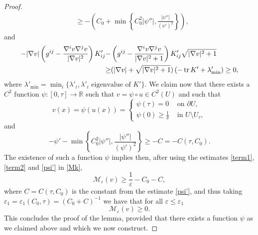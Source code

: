 \documentclass[11pt]{amsart}
\renewcommand{\epsilon}{\varepsilon}
\def\R{\mathbb{R}}
\def\e{\epsilon}
\def\t{\tau}
\def\l{\lambda}
\begin{document}
\begin{proof}
\begin{equation}
\begin{split}
&\ge -\left(C_0+\min\left\{C_0^2|\psi''|,\frac{|\psi''|}{(\psi')^2}\right\}\right),
\end{split}
\end{equation}
and
\begin{equation}\label{term2}
\begin{split}
-|\nabla v|\left(g^{ij}-\dfrac{\nabla^iv \nabla^j v}{|\nabla v|^2}\right)K'_{ij}-&\left(g^{ij}-\dfrac{\nabla^iv \nabla^j v}{|\nabla v|^2+1}\right)K'_{ij} \sqrt{|\nabla v|^2+1}\\
\ge&(|\nabla v|+\sqrt{|\nabla v|^2+1})\left(-\tr K'+\l'_{\min}\right)\ge 0,
\end{split}
\end{equation}
where $\l'_{\min}=\min_i\{\l'_i, \l'_i\text{  eigenvalue of  } K'\}$. We claim now  that there exists a $C^2$ function $\psi:[0,\tau]\to \R$ such that $v=\psi\circ u\in C^2(U)$ and such that
\[v(x)=\psi(u(x))=\begin{cases}\psi(\tau)=0&\text{ on  }\partial U,\\
\psi(0)\ge \frac{1}{\delta} &\text{ in  } U\setminus U_\t,
\end{cases}\]
and
\begin{equation}\label{psi'}
-\psi'-\min\left\{C_0^2|\psi''|,\frac{|\psi''|}{(\psi')^2}\right\}\ge -C=-C(\tau, C_0).
\end{equation}
The existence of such a function $\psi$ implies then, after using the estimates \eqref{term1}, \eqref{term2} and \eqref{psi'} in \eqref{Mk}, 
\[
\mathcal M_\e(v)\ge\frac{1}{\e}-C_0-C,\]
where $C=C(\tau, C_0)$ is the constant from the estimate  \eqref{psi'}, and thus taking $\e_1=\e_1(C_0,\t)=({C_0+C})^{-1}$ we have that for all $\e\le \e_1$
\[\mathcal M_\e(v)\ge 0.\]
This concludes the proof of the lemma, provided that there exists a function $\psi$ as we claimed above and which we now construct.


\end{proof}
\end{document}
